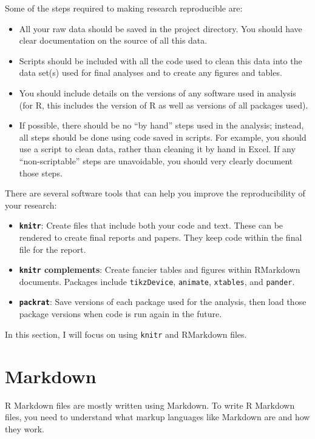 \documentclass[]{book}
\providecommand{\tightlist}{%
  \setlength{\itemsep}{0pt}\setlength{\parskip}{0pt}}
\begin{document}
Some of the steps required to making research reproducible are:

\begin{itemize}
\tightlist
\item
  All your raw data should be saved in the project directory. You should
  have clear documentation on the source of all this data.
\item
  Scripts should be included with all the code used to clean this data
  into the data set(s) used for final analyses and to create any figures
  and tables.
\item
  You should include details on the versions of any software used in
  analysis (for R, this includes the version of R as well as versions of
  all packages used).
\item
  If possible, there should be no ``by hand'' steps used in the
  analysis; instead, all steps should be done using code saved in
  scripts. For example, you should use a script to clean data, rather
  than cleaning it by hand in Excel. If any ``non-scriptable'' steps are
  unavoidable, you should very clearly document those steps.
\end{itemize}

There are several software tools that can help you improve the
reproducibility of your research:

\begin{itemize}
\tightlist
\item
  \textbf{\texttt{knitr}}: Create files that include both your code and
  text. These can be rendered to create final reports and papers. They
  keep code within the final file for the report.
\item
  \textbf{\texttt{knitr} complements}: Create fancier tables and figures
  within RMarkdown documents. Packages include \texttt{tikzDevice},
  \texttt{animate}, \texttt{xtables}, and \texttt{pander}.
\item
  \textbf{\texttt{packrat}}: Save versions of each package used for the
  analysis, then load those package versions when code is run again in
  the future.
\end{itemize}

In this section, I will focus on using \texttt{knitr} and RMarkdown
files.

\section{Markdown}\label{markdown}

R Markdown files are mostly written using Markdown. To write R Markdown
files, you need to understand what markup languages like Markdown are
and how they work.
\end{document}
